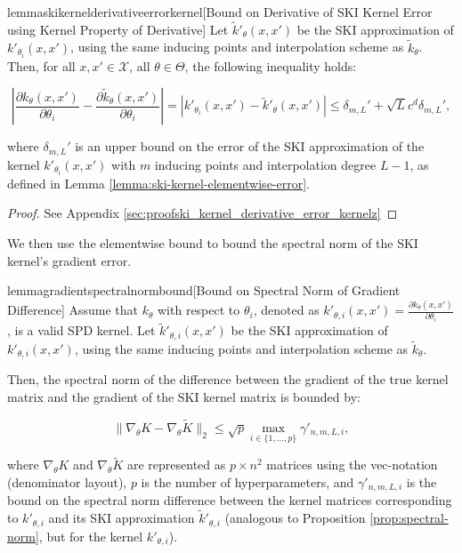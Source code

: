 \begin{restatable}{lemma}{skikernelderivativeerrorkernel}[Bound on Derivative of SKI Kernel Error using Kernel Property of Derivative]
\label{lemma:ski_kernel_derivative_error_kernel}
 Let $\tilde{k}'_{\theta}(x,x')$ be the SKI approximation of $k'_{\theta_i}(x,x')$, using the same inducing points and interpolation scheme as $\tilde{k}_{\theta}$. Then, for all $x, x' \in \mathcal{X}$, all $\theta \in \Theta$, the following inequality holds:

\begin{equation*}
\left\vert \frac{\partial k_{\theta}(x,x')}{\partial \theta_i}-\frac{\partial \tilde{k}_{\theta}(x,x')}{\partial \theta_i}\right\vert = \left\vert k'_{\theta_i}(x, x') - \tilde{k}'_{\theta}(x, x') \right\vert \leq\delta_{m,L}'+\sqrt{L}c^d\delta_{m,L}',
\end{equation*}

where $\delta_{m,L}'$ is an upper bound on the error of the SKI approximation of the kernel $k'_{\theta_i}(x,x')$ with $m$ inducing points and interpolation degree $L-1$, as defined in Lemma \ref{lemma:ski-kernel-elementwise-error}.
\end{restatable}
\begin{proof}
    See Appendix \ref{sec:proofski_kernel_derivative_error_kernelz}
\end{proof}

We then use the elementwise bound to bound the spectral norm of the SKI kernel's gradient error.

\begin{restatable}{lemma}{gradientspectralnormbound}[Bound on Spectral Norm of Gradient Difference]
\label{lemma:gradient_spectral_norm_bound}
Assume that  $k_{\theta}$ with respect to $\theta_i$, denoted as $k'_{\theta,i}(x, x') = \frac{\partial k_{\theta}(x, x')}{\partial \theta_i}$, is a valid SPD kernel. Let $\tilde{k}'_{\theta,i}(x,x')$ be the SKI approximation of $k'_{\theta,i}(x,x')$, using the same inducing points and interpolation scheme as $\tilde{k}_{\theta}$.

Then, the spectral norm of the difference between the gradient of the true kernel matrix and the gradient of the SKI kernel matrix is bounded by:

\begin{equation}
\| \nabla_\theta K - \nabla_\theta \tilde{K} \|_2 \leq \sqrt{p} \max_{i \in \{1,\ldots,p\}} \gamma'_{n,m,L,i},
\end{equation}

where $\nabla_\theta K$ and $\nabla_\theta \tilde{K}$ are represented as $p \times n^2$ matrices using the vec-notation (denominator layout), $p$ is the number of hyperparameters, and $\gamma'_{n,m,L,i}$ is the bound on the spectral norm difference between the kernel matrices corresponding to $k'_{\theta,i}$ and its SKI approximation $\tilde{k}'_{\theta,i}$ (analogous to Proposition \ref{prop:spectral-norm}, but for the kernel $k'_{\theta,i}$).
\end{restatable}

